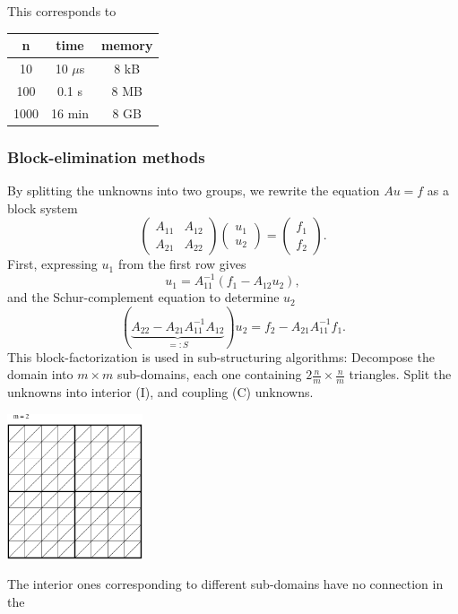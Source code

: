 This corresponds to
\begin{center}
\begin{tabular}{ccc}
        n & time & memory \\
        \hline
        10 & 10 $\mu$s & 8 kB \\
        100 & 0.1 s & 8 MB \\
        1000 & 16 min & 8 GB 
\end{tabular}
\end{center}
\bigskip

\subsubsection{Block-elimination methods}
By splitting the unknowns into two groups, we rewrite the equation $A u = f$ as
a block system
$$
\left( \begin{array}{cc}
        A_{11} & A_{12} \\
        A_{21} & A_{22} 
        \end{array} \right)
\left( \begin{array}{c}
        u_1 \\ u_2 
        \end{array} \right) =
\left( \begin{array}{c}
        f_1 \\ f_2 
        \end{array} \right).
$$
First, expressing $u_1$ from the first row gives
$$
u_1 = A_{11}^{-1} (f_1 - A_{12} u_2),
$$
and the Schur-complement equation to determine $u_2$
$$
(\underbrace{A_{22} - A_{21} A_{11}^{-1} A_{12}}_{=: S}) u_2 = f_2 - A_{21} A_{11}^{-1} f_1.
$$
This block-factorization is used in sub-structuring algorithms:
Decompose the domain into $m \times m$ sub-domains, each one containing
 $2 \frac{n}{m} \times \frac{n}{m}$ triangles. Split the unknowns into interior (I),
and coupling (C) unknowns. 
\begin{center}
\includegraphics[width=4cm]{pictures/substructure}
\end{center}
The interior ones corresponding to different sub-domains have no connection in the
